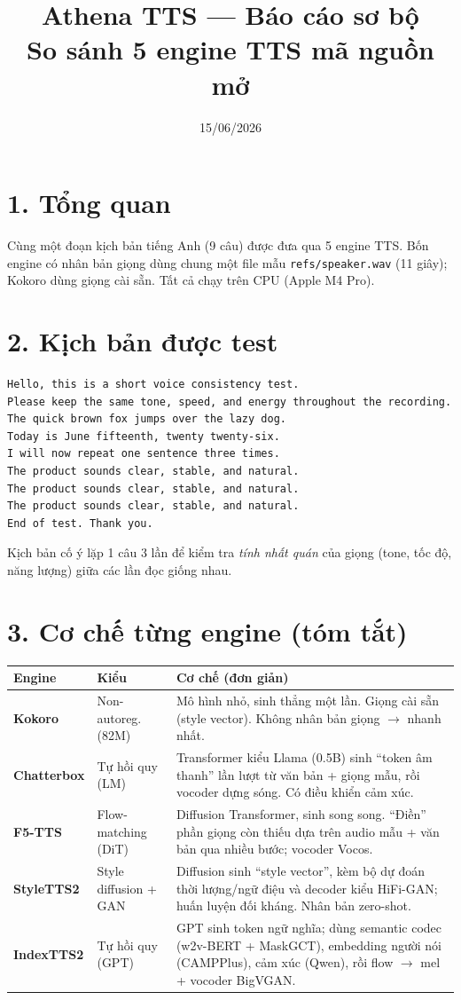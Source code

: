 \documentclass[11pt]{article}
\title{\textbf{Athena TTS — Báo cáo sơ bộ}\\[2pt]
\large So sánh 5 engine TTS mã nguồn mở}
\author{}
\date{15/06/2026}
\begin{document}
\maketitle
\vspace{-1.5em}

\section*{1. Tổng quan}
Cùng một đoạn kịch bản tiếng Anh (9 câu) được đưa qua 5 engine TTS. Bốn engine có
nhân bản giọng dùng chung một file mẫu \texttt{refs/speaker.wav} (11 giây); Kokoro
dùng giọng cài sẵn. Tất cả chạy trên CPU (Apple M4 Pro).

\section*{2. Kịch bản được test}
\begin{Verbatim}[frame=single,fontsize=\small,rulecolor=\color{gray}]
Hello, this is a short voice consistency test.
Please keep the same tone, speed, and energy throughout the recording.
The quick brown fox jumps over the lazy dog.
Today is June fifteenth, twenty twenty-six.
I will now repeat one sentence three times.
The product sounds clear, stable, and natural.
The product sounds clear, stable, and natural.
The product sounds clear, stable, and natural.
End of test. Thank you.
\end{Verbatim}
\noindent Kịch bản cố ý lặp 1 câu 3 lần để kiểm tra \textit{tính nhất quán} của giọng
(tone, tốc độ, năng lượng) giữa các lần đọc giống nhau.

\section*{3. Cơ chế từng engine (tóm tắt)}
\begin{table}[H]\centering\small
\begin{tabular}{>{\bfseries}l l p{9.2cm}}
\toprule
Engine & Kiểu & Cơ chế (đơn giản) \\
\midrule
Kokoro & Non-autoreg. (82M) & Mô hình nhỏ, sinh thẳng một lần. Giọng cài sẵn (style vector). Không nhân bản giọng $\rightarrow$ nhanh nhất. \\
Chatterbox & Tự hồi quy (LM) & Transformer kiểu Llama (0.5B) sinh ``token âm thanh'' lần lượt từ văn bản + giọng mẫu, rồi vocoder dựng sóng. Có điều khiển cảm xúc. \\
F5-TTS & Flow-matching (DiT) & Diffusion Transformer, sinh song song. ``Điền'' phần giọng còn thiếu dựa trên audio mẫu + văn bản qua nhiều bước; vocoder Vocos. \\
StyleTTS2 & Style diffusion + GAN & Diffusion sinh ``style vector'', kèm bộ dự đoán thời lượng/ngữ điệu và decoder kiểu HiFi-GAN; huấn luyện đối kháng. Nhân bản zero-shot. \\
IndexTTS2 & Tự hồi quy (GPT) & GPT sinh token ngữ nghĩa; dùng semantic codec (w2v-BERT + MaskGCT), embedding người nói (CAMPPlus), cảm xúc (Qwen), rồi flow $\rightarrow$ mel + vocoder BigVGAN. \\
\bottomrule
\end{tabular}
\end{table}
\end{document}
